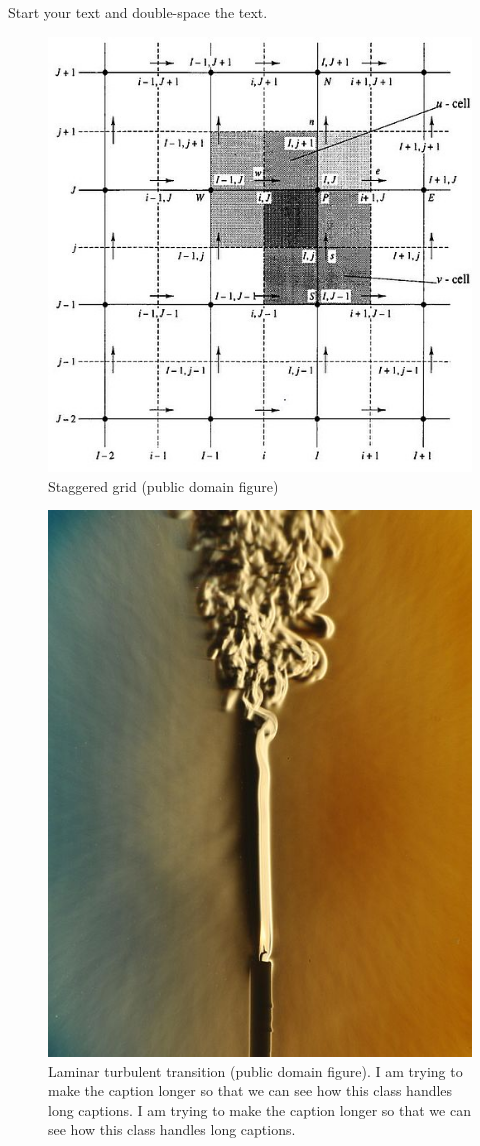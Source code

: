 \documentclass[debug, font=Times]{gw-dissertation}[2021/11/19]
\begin{document}
Start your text and double-space the text.
\begin{figure}[h!]
    \Centering
    \includegraphics[width=0.5\linewidth]{grid.jpg}
    \caption{Staggered grid (public domain figure)}
\end{figure}
\begin{figure}[h!]
    \includegraphics{laminar_turbulent_transition.jpg}
    \caption{%
        Laminar turbulent transition (public domain figure). I am trying to make the caption %
        longer so that we can see how this class handles long captions. I am trying to make the %
        caption longer so that we can see how this class handles long captions.%
    }
\end{figure}
\end{document}
